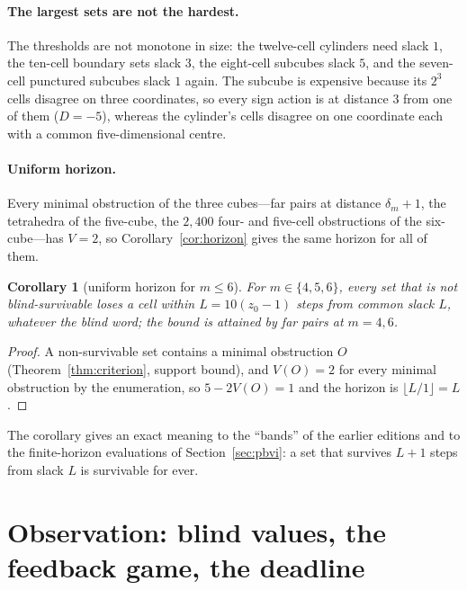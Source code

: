 \documentclass[11pt,a4paper]{article}
\theoremstyle{plain}
\newtheorem{corollary}[theorem]{Corollary}
\theoremstyle{definition}
\theoremstyle{remark}
\begin{document}
\paragraph{The largest sets are not the hardest.}
The thresholds are not monotone in size: the twelve-cell cylinders need slack $1$, the ten-cell boundary sets slack $3$, the eight-cell subcubes slack $5$, and the seven-cell punctured subcubes slack $1$ again. The subcube is expensive because its $2^3$ cells disagree on three coordinates, so every sign action is at distance $3$ from one of them ($D=-5$), whereas the cylinder's cells disagree on one coordinate each with a common five-dimensional centre.

\paragraph{Uniform horizon.}
Every minimal obstruction of the three cubes---far pairs at distance $\delta_m+1$, the tetrahedra of the five-cube, the $2{,}400$ four- and five-cell obstructions of the six-cube---has $V=2$, so Corollary~\ref{cor:horizon} gives the same horizon for all of them.

\begin{corollary}[uniform horizon for $m\le6$]\label{cor:uniform}
For $m\in\{4,5,6\}$, every set that is not blind-survivable loses a cell within $L=10(z_0-1)$ steps from common slack $L$, whatever the blind word; the bound is attained by far pairs at $m=4,6$.
\end{corollary}
\begin{proof}
A non-survivable set contains a minimal obstruction $O$ (Theorem~\ref{thm:criterion}, support bound), and $V(O)=2$ for every minimal obstruction by the enumeration, so $5-2V(O)=1$ and the horizon is $\lfloor L/1\rfloor=L$.
\end{proof}

The corollary gives an exact meaning to the ``bands'' of the earlier editions and to the finite-horizon evaluations of Section~\ref{sec:pbvi}: a set that survives $L+1$ steps from slack $L$ is survivable for ever.
\section{Observation: blind values, the feedback game, the deadline}\label{sec:observation}
\end{document}
